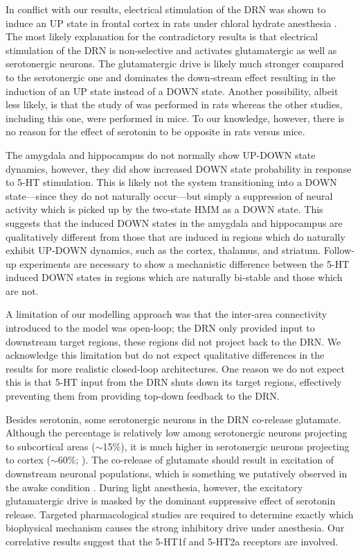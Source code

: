 \documentclass[11pt,a4paper,onecolumn]{article}
\begin{document}
In conflict with our results, electrical stimulation of the DRN was shown to induce an UP state in frontal cortex in rats under chloral hydrate anesthesia \citep{puigSerotoninModulatesFastSpiking2010}. The most likely explanation for the contradictory results is that electrical stimulation of the DRN is non-selective and activates glutamatergic as well as serotonergic neurons. The glutamatergic drive is likely much stronger compared to the serotonergic one and dominates the down-stream effect resulting in the induction of an UP state instead of a DOWN state. Another possibility, albeit less likely, is that the study of \citep{puigSerotoninModulatesFastSpiking2010} was performed in rats whereas the other studies, including this one, were performed in mice. To our knowledge, however, there is no reason for the effect of serotonin to be opposite in rats versus mice. 

The amygdala and hippocampus do not normally show UP-DOWN state dynamics, however, they did show increased DOWN state probability in response to 5-HT stimulation. This is likely not the system transitioning into a DOWN state—since they do not naturally occur—but simply a suppression of neural activity which is picked up by the two-state HMM as a DOWN state. This suggests that the induced DOWN states in the amygdala and hippocampus are qualitatively different from those that are induced in regions which do naturally exhibit UP-DOWN dynamics, such as the cortex, thalamus, and striatum. Follow-up experiments are necessary to show a mechanistic difference between the 5-HT induced DOWN states in regions which are naturally bi-stable and those which are not.

A limitation of our modelling approach was that the inter-area connectivity introduced to the model was open-loop; the DRN only provided input to downstream target regions, these regions did not project back to the DRN. We acknowledge this limitation but do not expect qualitative differences in the results for more realistic closed-loop architectures. One reason we do not expect this is that 5-HT input from the DRN shuts down its target regions, effectively preventing them from providing top-down feedback to the DRN.

Besides serotonin, some serotonergic neurons in the DRN co-release glutamate. Although the percentage is relatively low among serotonergic neurons projecting to subcortical areas ($\sim$15\%), it is much higher in serotonergic neurons projecting to cortex ($\sim$60\%; \citealt{ren_anatomically_2018}). The co-release of glutamate should result in excitation of downstream neuronal populations, which is something we putatively observed in the awake condition \citep{meijerSerotoninDrivesChoiceindependent2025}. During light anesthesia, however, the excitatory glutamatergic drive is masked by the dominant suppressive effect of serotonin release. Targeted pharmacological studies are required to determine exactly which biophysical mechanism causes the strong inhibitory drive under anesthesia. Our correlative results suggest that the 5-HT1f and 5-HT2a receptors are involved. 
\end{document}
